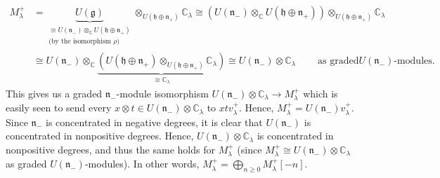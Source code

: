 \documentclass
[numbers=enddot,12pt,final,onecolumn,german,notitlepage]{scrartcl}%
\theoremstyle{definition}
\begin{document}
\begin{align*}
M_{\lambda}^{+}  &  =\underbrace{U\left(  \mathfrak{g}\right)  }%
_{\substack{\cong U\left(  \mathfrak{n}_{-}\right)  \otimes_{\mathbb{C}%
}U\left(  \mathfrak{h}\oplus\mathfrak{n}_{+}\right)  \\\text{(by the
isomorphism }\rho\text{)}}}\otimes_{U\left(  \mathfrak{h}\oplus\mathfrak{n}%
_{+}\right)  }\mathbb{C}_{\lambda}\cong\left(  U\left(  \mathfrak{n}%
_{-}\right)  \otimes_{\mathbb{C}}U\left(  \mathfrak{h}\oplus\mathfrak{n}%
_{+}\right)  \right)  \otimes_{U\left(  \mathfrak{h}\oplus\mathfrak{n}%
_{+}\right)  }\mathbb{C}_{\lambda}\\
&  \cong U\left(  \mathfrak{n}_{-}\right)  \otimes_{\mathbb{C}}%
\underbrace{\left(  U\left(  \mathfrak{h}\oplus\mathfrak{n}_{+}\right)
\otimes_{U\left(  \mathfrak{h}\oplus\mathfrak{n}_{+}\right)  }\mathbb{C}%
_{\lambda}\right)  }_{\cong\mathbb{C}_{\lambda}}\cong U\left(  \mathfrak{n}%
_{-}\right)  \otimes\mathbb{C}_{\lambda}\ \ \ \ \ \ \ \ \ \ \text{as graded
}U\left(  \mathfrak{n}_{-}\right)  \text{-modules.}%
\end{align*}
This gives us a graded $\mathfrak{n}_{-}$-module isomorphism $U\left(
\mathfrak{n}_{-}\right)  \otimes\mathbb{C}_{\lambda}\rightarrow M_{\lambda
}^{+}$ which is easily seen to send every $x\otimes t\in U\left(
\mathfrak{n}_{-}\right)  \otimes\mathbb{C}_{\lambda}$ to $xtv_{\lambda}^{+}$.
Hence, $M_{\lambda}^{+}=U\left(  \mathfrak{n}_{-}\right)  v_{\lambda}^{+}$.
Since $\mathfrak{n}_{-}$ is concentrated in negative degrees, it is clear that
$U\left(  \mathfrak{n}_{-}\right)  $ is concentrated in nonpositive degrees.
Hence, $U\left(  \mathfrak{n}_{-}\right)  \otimes\mathbb{C}_{\lambda}$ is
concentrated in nonpositive degrees, and thus the same holds for $M_{\lambda
}^{+}$ (since $M_{\lambda}^{+}\cong U\left(  \mathfrak{n}_{-}\right)
\otimes\mathbb{C}_{\lambda}$ as graded $U\left(  \mathfrak{n}_{-}\right)
$-modules). In other words, $M_{\lambda}^{+}=\bigoplus\limits_{n\geq
0}M_{\lambda}^{+}\left[  -n\right]  $.
\end{document}
